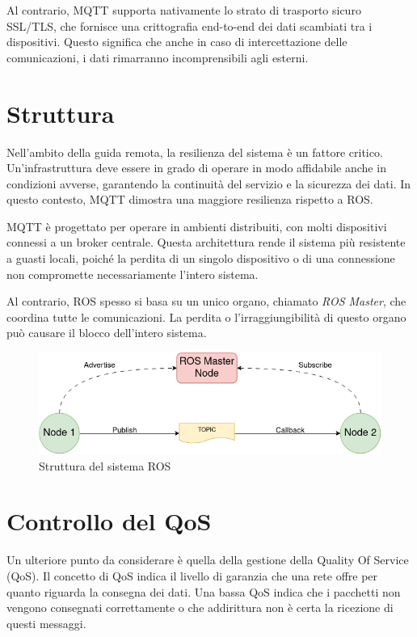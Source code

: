 \noindent Al contrario, MQTT supporta nativamente lo strato di trasporto sicuro SSL/TLS, che fornisce una crittografia end-to-end dei dati scambiati tra i dispositivi. Questo significa che anche in caso di intercettazione delle comunicazioni, i dati rimarranno incomprensibili agli esterni.

\section{Struttura}
Nell'ambito della guida remota, la resilienza del sistema è un fattore critico. Un'infrastruttura deve essere in grado di operare in modo affidabile anche in condizioni avverse, garantendo la continuità del servizio e la sicurezza dei dati. In questo contesto, MQTT dimostra una maggiore resilienza rispetto a ROS. 

\noindent MQTT è progettato per operare in ambienti distribuiti, con molti dispositivi connessi a un broker centrale. Questa architettura rende il sistema più resistente a guasti locali, poiché la perdita di un singolo dispositivo o di una connessione non compromette necessariamente l'intero sistema.

\noindent Al contrario, ROS spesso si basa su un unico organo, chiamato \textit{ROS Master}, che coordina tutte le comunicazioni. La perdita o l'irraggiungibilità di questo organo può causare il blocco dell'intero sistema.

\begin{figure}[H]
  \centering
  \includegraphics[width=1\textwidth]{figures/ros_master.png}
  \caption{Struttura del sistema ROS}
  \label{struttura_ros}
\end{figure}

\section{Controllo del QoS}
Un ulteriore punto da considerare è quella della gestione della Quality Of Service  (QoS). Il concetto di QoS indica il livello di garanzia che una rete offre per quanto riguarda la consegna dei dati. Una bassa QoS indica che i pacchetti non vengono consegnati correttamente o che addirittura non è certa la ricezione di questi messaggi.  

